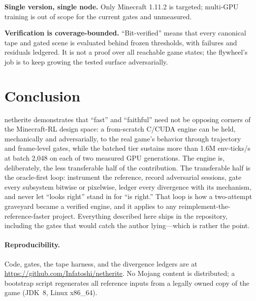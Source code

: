 \documentclass[11pt]{article}
\begin{document}
\textbf{Single version, single node.} Only Minecraft 1.11.2 is targeted; multi-GPU training is out of scope for the current gates and unmeasured.

\textbf{Verification is coverage-bounded.} ``Bit-verified'' means that every canonical tape and gated scene is evaluated behind frozen thresholds, with failures and residuals ledgered. It is not a proof over all reachable game states; the flywheel's job is to keep growing the tested surface adversarially.

\section{Conclusion}
\label{sec:conclusion}

netherite demonstrates that ``fast'' and ``faithful'' need not be opposing corners of the Minecraft-RL design space: a from-scratch C/CUDA engine can be held, mechanically and adversarially, to the real game's behavior through trajectory and frame-level gates, while the batched tier sustains more than 1.6M env-ticks/s at batch 2{,}048 on each of two measured GPU generations. The engine is, deliberately, the less transferable half of the contribution. The transferable half is the oracle-first loop: instrument the reference, record adversarial sessions, gate every subsystem bitwise or pixelwise, ledger every divergence with its mechanism, and never let ``looks right'' stand in for ``is right.'' That loop is how a two-attempt graveyard became a verified engine, and it applies to any reimplement-the-reference-faster project. Everything described here ships in the repository, including the gates that would catch the author lying---which is rather the point.

\paragraph{Reproducibility.} Code, gates, the tape harness, and the divergence ledgers are at \url{https://github.com/Infatoshi/netherite}. No Mojang content is distributed; a bootstrap script regenerates all reference inputs from a legally owned copy of the game (JDK~8, Linux x86\_64).



\end{document}
